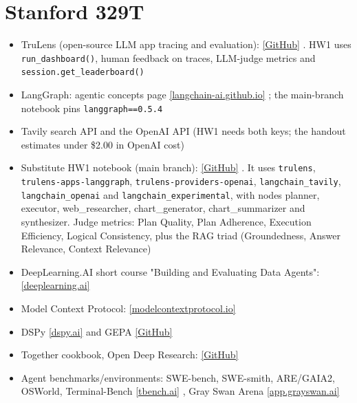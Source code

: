 \documentclass[10pt,oneside]{report}
\begin{document}
\section{Stanford 329T}
{\small\begin{itemize}
\item TruLens (open-source LLM app tracing and evaluation): \href{https://github.com/truera/trulens}{[GitHub]} . HW1 uses \texttt{run\_\allowbreak{}dashboard()}, human feedback on traces, LLM-judge metrics and \texttt{session.\allowbreak{}get\_\allowbreak{}leaderboard()}
\item LangGraph: agentic concepts page \href{https://langchain-ai.github.io/langgraph/concepts/agentic_concepts/}{[langchain-ai.github.io]} ; the main-branch notebook pins \texttt{langgraph==0.\allowbreak{}5.\allowbreak{}4}
\item Tavily search API and the OpenAI API (HW1 needs both keys; the handout estimates under \$2.00 in OpenAI cost)
\item Substitute HW1 notebook (main branch): \href{https://github.com/truera/trulens/blob/main/examples/experimental/web-search-agent-human-annotation-flow.ipynb}{[GitHub]} . It uses \texttt{trulens}, \texttt{trulens-apps-langgraph}, \texttt{trulens-providers-openai}, \texttt{langchain\_\allowbreak{}tavily}, \texttt{langchain\_\allowbreak{}openai} and \texttt{langchain\_\allowbreak{}experimental}, with nodes planner, executor, web\_\allowbreak{}researcher, chart\_\allowbreak{}generator, chart\_\allowbreak{}summarizer and synthesizer. Judge metrics: Plan Quality, Plan Adherence, Execution Efficiency, Logical Consistency, plus the RAG triad (Groundedness, Answer Relevance, Context Relevance)
\item DeepLearning.AI short course "Building and Evaluating Data Agents": \href{https://www.deeplearning.ai/short-courses/building-and-evaluating-data-agents/}{[deeplearning.ai]}
\item Model Context Protocol: \href{https://modelcontextprotocol.io/docs/getting-started/intro}{[modelcontextprotocol.io]}
\item DSPy \href{https://dspy.ai/}{[dspy.ai]} and GEPA \href{https://github.com/gepa-ai/gepa}{[GitHub]}
\item Together cookbook, Open Deep Research: \href{https://github.com/togethercomputer/together-cookbook/blob/main/Agents/Together_Open_Deep_Research_CookBook.ipynb}{[GitHub]}
\item Agent benchmarks/environments: SWE-bench, SWE-smith, ARE/GAIA2, OSWorld, Terminal-Bench \href{https://www.tbench.ai/}{[tbench.ai]} , Gray Swan Arena \href{https://app.grayswan.ai/arena}{[app.grayswan.ai]}
\end{itemize}}
\end{document}
